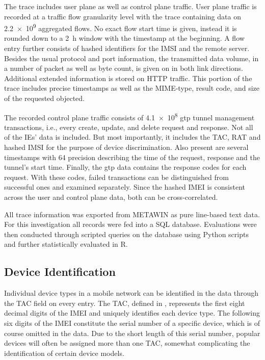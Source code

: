 The trace includes user plane as well as control plane traffic. User plane traffic is recorded at a traffic flow granularity level with the trace containing data on \num{2.2e9} aggregated flows. No exact flow start time is given, instead it is rounded down to a \SI{2}{\hour} window with the timestamp at the beginning. A flow entry further consists of hashed identifiers for the \gls{IMSI} and the remote server. Besides the usual protocol and port information, the transmitted data volume, in a number of packet as well as byte count, is given on in both link directions. Additional extended information is stored on \gls{HTTP} traffic. This portion of the trace includes precise timestamps as well as the \acrshort{MIME}-type, result code, and size of the requested objected.

The recorded control plane traffic consists of \num{4.1e8} \gls{gtp} tunnel management transactions, i.e., every create, update, and delete request and response. Not all of the \glspl{IE}' data is included. But most importantly, it includes the \gls{TAC}, \gls{RAT} and hashed \gls{IMSI} for the purpose of device discrimination. Also present are several timestamps with \SI{64}{\bit} precision describing the time of the request, response and the tunnel's start time. Finally, the \gls{gtp} data contains the response codes for each request. With these codes, failed transactions can be distinguished from successful ones and examined separately. Since the hashed \gls{IMEI} is consistent across the user and control plane data, both can be cross-correlated.

All trace information was exported from \acrshort{METAWIN} as pure line-based text data. For this investigation all records were fed into a \acrshort{SQL} database. Evaluations were then conducted through scripted queries on the database using Python scripts and further statistically evaluated in R.

\subsection{Device Identification}

Individual device types in a mobile network can be identified in the data through the \gls{TAC} field on every entry. The \gls{TAC}, defined in \cite{3gpp.23.003}, represents the first eight decimal digits of the \gls{IMEI} and uniquely identifies each device type. The following six digits of the \gls{IMEI} constitute the serial number of a specific device, which is of course omitted in the data. Due to the short length of this serial number, popular devices will often be assigned more than one \gls{TAC}, somewhat complicating the identification of certain device models.

